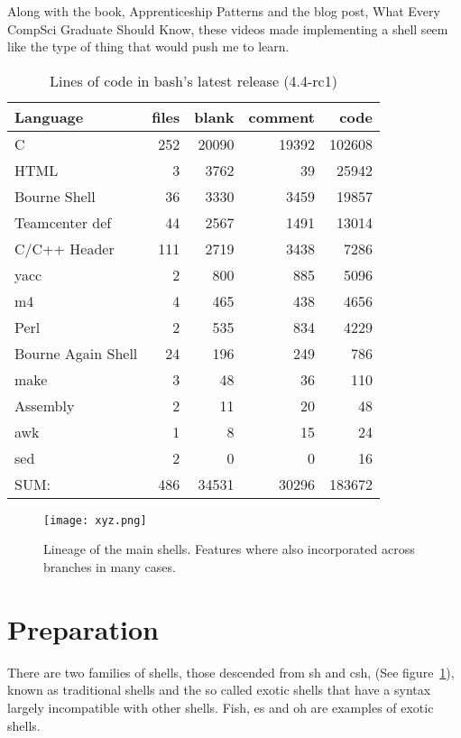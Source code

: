 Along with the book, Apprenticeship Patterns\cite{APPRENTICESHIP-PATTERNS} and the blog post, What Every CompSci Graduate Should Know\cite{EVERY-COMPSCI-GRAD}, these videos made implementing a shell seem like the type of thing that would push me to learn.

\begin{table}[hp]
\centering
\caption{Lines of code in bash's latest release (4.4-rc1)}
\label{tab:bash-loc}
\begin{tabular}{@{}lrrrr@{}}
\toprule
Language           & files & blank & comment & code   \\ \midrule
C                  & 252   & 20090 & 19392   & 102608 \\
HTML               & 3     & 3762  & 39      & 25942  \\
Bourne Shell       & 36    & 3330  & 3459    & 19857  \\
Teamcenter def     & 44    & 2567  & 1491    & 13014  \\
C/C++ Header       & 111   & 2719  & 3438    & 7286   \\
yacc               & 2     & 800   & 885     & 5096   \\
m4                 & 4     & 465   & 438     & 4656   \\
Perl               & 2     & 535   & 834     & 4229   \\
Bourne Again Shell & 24    & 196   & 249     & 786    \\
make               & 3     & 48    & 36      & 110    \\
Assembly           & 2     & 11    & 20      & 48     \\
awk                & 1     & 8     & 15      & 24     \\
sed                & 2     & 0     & 0       & 16     \\ \midrule
SUM:               & 486   & 34531 & 30296   & 183672 \\ \bottomrule
\end{tabular}
\end{table}

\begin{figure}[hp]
    \centering
    \texttt{[image: xyz.png]}
    \caption[Lineage of the main shells]{Lineage of the main shells\cite{SHELL-HISTORY}. Features where also incorporated across branches in many cases.}
    \label{fig:shell-history}
\end{figure}

\section{Preparation}
There are two families of shells, those descended from sh and csh, (See figure~\ref{fig:shell-history}), known as traditional shells and the so called exotic shells that have a syntax largely incompatible with other shells. Fish\cite{FISH}, es\cite{ES-SHELL} and oh\cite{OH-SHELL} are examples of exotic shells.

